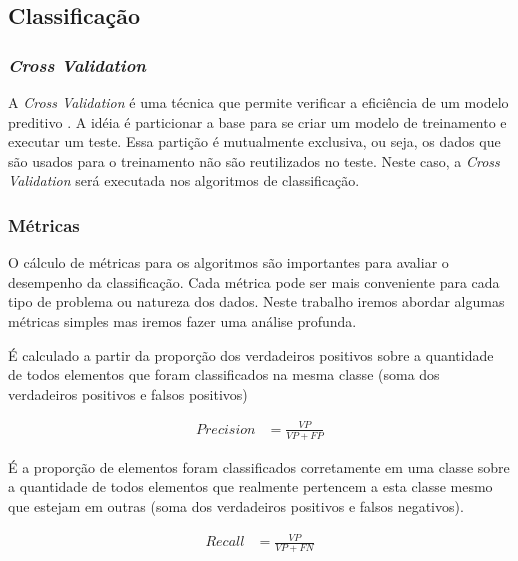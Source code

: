 \subsection{Classificação}

\subsubsection{\emph{Cross Validation}}

A \emph{Cross Validation} é uma técnica que permite verificar a eficiência de um modelo preditivo \cite[p. 241]{HASTIE}. A idéia é particionar a base para se criar um modelo de treinamento e executar um teste. Essa partição é mutualmente exclusiva, ou seja, os dados que são usados para o treinamento não são reutilizados no teste. Neste caso, a \emph{Cross Validation} será executada nos algoritmos de classificação.


\subsubsection{Métricas}
O cálculo de métricas para os algoritmos são importantes para avaliar o desempenho da classificação. Cada métrica pode ser mais conveniente para cada tipo de problema ou natureza dos dados. Neste trabalho iremos abordar algumas métricas simples mas iremos fazer uma análise profunda.


É calculado a partir da proporção dos verdadeiros positivos sobre a quantidade de todos elementos que foram classificados na mesma classe (soma dos verdadeiros positivos e falsos positivos)

\begin{equation}
  \label{eq:precision}
  \begin{aligned}
Precision &= \frac{VP}{VP + FP} 
  \end{aligned}  
\end{equation}


É a proporção de elementos foram classificados corretamente em uma classe 
sobre a quantidade de todos elementos que realmente pertencem a esta classe mesmo que estejam em outras (soma dos verdadeiros positivos e falsos negativos). 

\begin{equation}
  \label{eq:precision}
  \begin{aligned}
Recall &= \frac{VP}{VP + FN} 
  \end{aligned}  
\end{equation}

